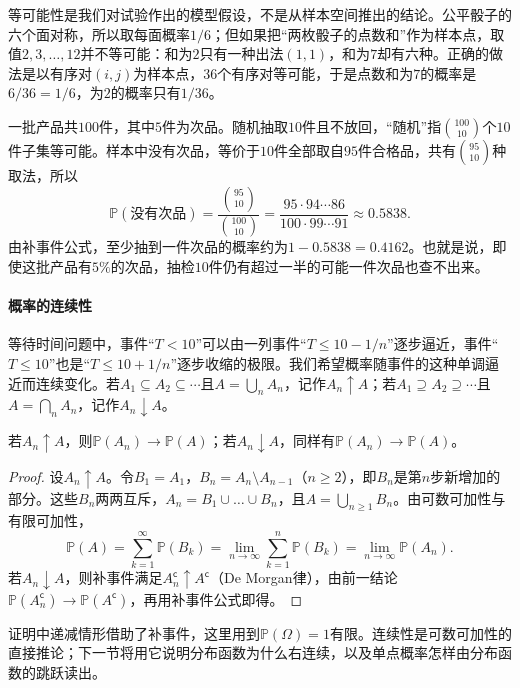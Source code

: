 等可能性是我们对试验作出的模型假设，不是从样本空间推出的结论。公平骰子的六个面对称，所以取每面概率$1/6$；但如果把“两枚骰子的点数和”作为样本点，取值$2,3,\dots,12$并不等可能：和为$2$只有一种出法$(1,1)$，和为$7$却有六种。正确的做法是以有序对$(i,j)$为样本点，$36$个有序对等可能，于是点数和为$7$的概率是$6/36=1/6$，为$2$的概率只有$1/36$。

\begin{example}[抽检中至少一件次品]
\label{ex:prob-inspection-hypergeometric}
一批产品共$100$件，其中$5$件为次品。随机抽取$10$件且不放回，“随机”指$\binom{100}{10}$个$10$件子集等可能。样本中没有次品，等价于$10$件全部取自$95$件合格品，共有$\binom{95}{10}$种取法，所以
\[
  \mathbb{P}(\text{没有次品})=\frac{\binom{95}{10}}{\binom{100}{10}}
  =\frac{95\cdot94\cdots86}{100\cdot99\cdots91}\approx0.5838 .
\]
由补事件公式，至少抽到一件次品的概率约为$1-0.5838=0.4162$。也就是说，即使这批产品有$5\%$的次品，抽检$10$件仍有超过一半的可能一件次品也查不出来。
\end{example}

\paragraph{概率的连续性}
等待时间问题中，事件“$T<10$”可以由一列事件“$T\leq10-1/n$”逐步逼近，事件“$T\leq10$”也是“$T\leq10+1/n$”逐步收缩的极限。我们希望概率随事件的这种单调逼近而连续变化。若$A_1\subseteq A_2\subseteq\cdots$且$A=\bigcup_nA_n$，记作$A_n\uparrow A$；若$A_1\supseteq A_2\supseteq\cdots$且$A=\bigcap_nA_n$，记作$A_n\downarrow A$。

\begin{theorem}[概率的连续性]
\label{thm:prob-continuity}
若$A_n\uparrow A$，则$\mathbb{P}(A_n)\to\mathbb{P}(A)$；若$A_n\downarrow A$，同样有$\mathbb{P}(A_n)\to\mathbb{P}(A)$。
\end{theorem}
\begin{proof}
设$A_n\uparrow A$。令$B_1=A_1$，$B_n=A_n\setminus A_{n-1}$（$n\geq2$），即$B_n$是第$n$步新增加的部分。这些$B_n$两两互斥，$A_n=B_1\cup\dots\cup B_n$，且$A=\bigcup_{n\geq1}B_n$。由可数可加性与有限可加性，
\[
  \mathbb{P}(A)=\sum_{k=1}^{\infty}\mathbb{P}(B_k)
  =\lim_{n\to\infty}\sum_{k=1}^{n}\mathbb{P}(B_k)
  =\lim_{n\to\infty}\mathbb{P}(A_n).
\]
若$A_n\downarrow A$，则补事件满足$A_n^{\mathsf c}\uparrow A^{\mathsf c}$（De Morgan律），由前一结论$\mathbb{P}(A_n^{\mathsf c})\to\mathbb{P}(A^{\mathsf c})$，再用补事件公式即得。
\end{proof}

证明中递减情形借助了补事件，这里用到$\mathbb{P}(\Omega)=1$有限。连续性是可数可加性的直接推论；下一节将用它说明分布函数为什么右连续，以及单点概率怎样由分布函数的跳跃读出。

